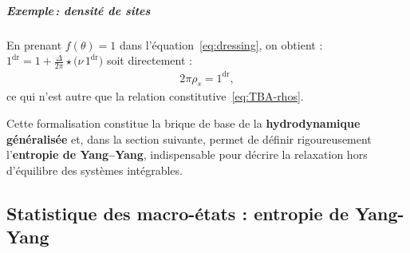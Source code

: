 \subparagraph{Exemple\,: densité de sites}

En prenant $f(\theta) = 1$ dans l’équation~\eqref{eq:dressing}, on obtient :
\(
1^{\mathrm{dr}}=1+\frac{\Delta}{2\pi}\star\bigl(\nu\,1^{\mathrm{dr}}\bigr)
\) soit directement : 
\begin{eqnarray}
	2\pi\rho_s = 1^{\mathrm{dr}},\label{eq:TBA-rhos-2}
\end{eqnarray}
ce qui n’est autre que la relation constitutive~\eqref{eq:TBA-rhos}.

\medskip
Cette formalisation constitue la brique de base de la \textbf{hydrodynamique généralisée} et, dans la section suivante, permet de définir rigoureusement l’\textbf{entropie de Yang–Yang}, indispensable pour décrire la relaxation hors d’équilibre des systèmes intégrables.


%



\subsection{Statistique des macro-états : entropie de Yang-Yang}



